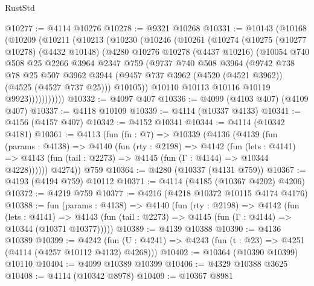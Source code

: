 \begin{lexlean}{RustStd}
\begin{coremodule}
@10277 := @4114 @10276
@10278 := @9321 @10268
@10331 := @10143
    (@10168
      (@10209
        (@10211
          (@10213
            (@10230
              (@10246
                (@10261
                  (@10274
                    (@10275
                      (@10277 @10278)
                      (@4432 @10148)
                      (@4280
                        @10276
                        @10278
                        (@4437 @10216)
                        (@10054
                          @740
                          @508
                          @25
                          @2266
                          @3964
                          @2347
                          @759
                          (@9737
                            @740
                            @508
                            @3964
                            (@9742
                              @738
                              @78
                              @25
                              @507
                              @3962
                              @3944
                              (@9457 @737 @3962 (@4520 (@4521 @3962)) (@4525 (@4527 @737 @25)))
                              @10105))
                          @10110
                          @10113
                          @10116
                          @10119
                          @9923)))))))))))
@10332 := @4097 @407
@10336 := @4099 (@4103 @407) (@4109 @407)
@10337 := @4118 @10109
@10339 := @4114 (@10337 @4133)
@10341 := @4156 (@4157 @407)
@10342 := @4152 @10341
@10344 := @4114 (@10342 @4181)
@10361 := @4113
    (fun (fn : @7) =>
    @10339
      (@4136
        (@4139
          (fun (params : @4138) =>
          @4140
            (fun (rty : @2198) =>
            @4142
              (fun (lets : @4141) =>
              @4143 (fun (tail : @2273) => @4145 (fun (Γ : @4144) => @10344 @4228))))))
        @4274))
    @759
@10364 := @4280 (@10337 (@4131 @759))
@10367 := @4193 (@4194 @759) @10112
@10371 := @4114 (@4185 (@10367 @4202) @4206)
@10372 := @4219 @759
@10377 := @4216 (@4218 @10372 @10115 @4174 @4176)
@10388 := fun (params : @4138) =>
  @4140
    (fun (rty : @2198) =>
    @4142
      (fun (lets : @4141) =>
      @4143 (fun (tail : @2273) => @4145 (fun (Γ : @4144) => @10344 (@10371 @10377)))))
@10389 := @4139 @10388
@10390 := @4136 @10389
@10399 := @4242
    (fun (U : @4241) => @4243 (fun (t : @23) => @4251 (@4114 (@4257 @10112 @4132) @4268)))
@10402 := @10364 (@10390 @10399) @10110
@10404 := @4099 @10389 @10399
@10406 := @4329 @10388 @3625
@10408 := @4114 (@10342 @8978)
@10409 := @10367 @8981

\end{coremodule}
\end{lexlean}
